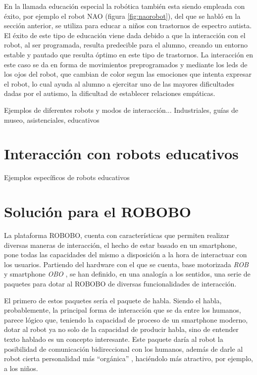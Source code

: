 En la llamada educación especial la robótica también esta siendo empleada con éxito, por ejemplo el robot NAO (figura \ref{fig:naorobot}), del que se habló en la sección anterior, se utiliza para educar a niños con trastornos de espectro autista. El éxito de este tipo de educación viene dada debido a que la interacción con el robot, al ser programada, resulta predecible para el alumno, creando un entorno estable y pautado que resulta óptimo en este tipo de trastornos. La interacción en este caso se da en forma de movimientos preprogramados y mediante los leds de los ojos del robot, que cambian de color segun las emociones que intenta expresar el robot, lo cual ayuda al alumno a ejercitar uno de las mayores dificultades dadas por el autismo, la dificultad de establecer relaciones empáticas.
 
  Ejemplos de diferentes robots y modos de interacción... Industriales, guías de museo, asistenciales, educativos
 
 \section{Interacción con robots educativos}
 \label{sec:hri-robots-educativos}
 Ejemplos específicos de robots educativos
 
 \section{Solución para el ROBOBO}
 \label{sec:hri-solucion-robobo}
 
 La plataforma ROBOBO, cuenta con características que permiten realizar diversas maneras de interacción, el hecho de estar basado en un smartphone, pone todas las capacidades del mismo a disposición a la hora de interactuar con los usuarios. Partiendo del hardware con el que se cuenta, base motorizada \textit{ROB} y smartphone \textit{OBO} , se han definido, en una analogía a los sentidos, una serie de paquetes para dotar al ROBOBO de diversas funcionalidades de interacción.
 
 El primero de estos paquetes sería el paquete de habla. Siendo el habla, probablemente, la principal forma de interacción que se da entre los humanos, parece lógico que, teniendo la capacidad de proceso de un smartphone moderno, dotar al robot ya no solo de la capacidad de producir habla, sino de entender texto hablado es un concepto interesante. Este paquete daría al robot la posibilidad de comunicación bidireccional con los humanos, además de darle al robot cierta personalidad más \enquote{orgánica} , haciéndolo más atractivo, por ejemplo, a los niños.
 
